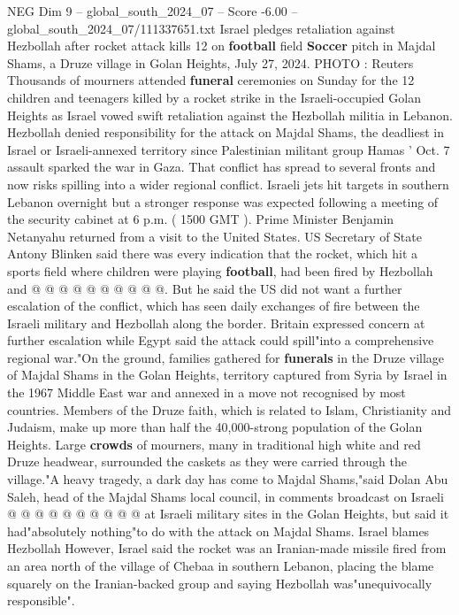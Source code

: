 \begin{textsample}{NEG Dim 9 – global\_south\_2024\_07 – Score -6.00 – global\_south\_2024\_07/111337651.txt}  \label{ex:f9_neg_331}
Israel pledges retaliation against Hezbollah after rocket attack kills 12 on \textbf{football} field \textbf{Soccer} pitch in Majdal Shams, a Druze village in Golan Heights, July 27, 2024.
PHOTO : Reuters Thousands of mourners attended \textbf{funeral} ceremonies on Sunday for the 12 children and teenagers killed by a rocket strike in the Israeli-occupied Golan Heights as Israel vowed swift retaliation against the Hezbollah militia in Lebanon.
Hezbollah denied responsibility for the attack on Majdal Shams, the deadliest in Israel or Israeli-annexed territory since Palestinian militant group Hamas ' Oct. 7 assault sparked the war in Gaza.
That conflict has spread to several fronts and now risks spilling into a wider regional conflict.
Israeli jets hit targets in southern Lebanon overnight but a stronger response was expected following a meeting of the security cabinet at 6 p.m. ( 1500 GMT ).
Prime Minister Benjamin Netanyahu returned from a visit to the United States.
US Secretary of State Antony Blinken said there was every indication that the rocket, which hit a sports field where children were playing \textbf{football}, had been fired by Hezbollah and @ @ @ @ @ @ @ @ @ @.
But he said the US did not want a further escalation of the conflict, which has seen daily exchanges of fire between the Israeli military and Hezbollah along the border.
Britain expressed concern at further escalation while Egypt said the attack could spill"into a comprehensive regional war."On the ground, families gathered for \textbf{funerals} in the Druze village of Majdal Shams in the Golan Heights, territory captured from Syria by Israel in the 1967 Middle East war and annexed in a move not recognised by most countries.
Members of the Druze faith, which is related to Islam, Christianity and Judaism, make up more than half the 40,000-strong population of the Golan Heights.
Large \textbf{crowds} of mourners, many in traditional high white and red Druze headwear, surrounded the caskets as they were carried through the village."A heavy tragedy, a dark day has come to Majdal Shams,"said Dolan Abu Saleh, head of the Majdal Shams local council, in comments broadcast on Israeli @ @ @ @ @ @ @ @ @ @ at Israeli military sites in the Golan Heights, but said it had"absolutely nothing"to do with the attack on Majdal Shams.
Israel blames Hezbollah However, Israel said the rocket was an Iranian-made missile fired from an area north of the village of Chebaa in southern Lebanon, placing the blame squarely on the Iranian-backed group and saying Hezbollah was"unequivocally responsible".

\end{textsample}
